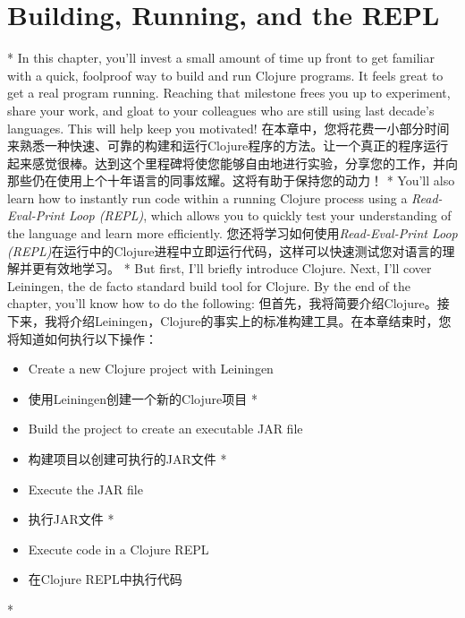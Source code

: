
\chapter{Building, Running, and the REPL}
\begin{paracol}{2}
\switchcolumn[0]*
In this chapter, you'll invest a small amount of time up front to get
familiar with a quick, foolproof way to build and run Clojure programs.
It feels great to get a real program running. Reaching that milestone
frees you up to experiment, share your work, and gloat to your
colleagues who are still using last decade's languages. This will help
keep you motivated!
\switchcolumn
在本章中，您将花费一小部分时间来熟悉一种快速、可靠的构建和运行Clojure程序的方法。让一个真正的程序运行起来感觉很棒。达到这个里程碑将使您能够自由地进行实验，分享您的工作，并向那些仍在使用上个十年语言的同事炫耀。这将有助于保持您的动力！
\switchcolumn[0]*
You'll also learn how to instantly run code within a running Clojure
process using a \emph{Read-Eval-Print Loop (REPL)}, which allows you to
quickly test your understanding of the language and learn more
efficiently.
\switchcolumn
您还将学习如何使用\emph{Read-Eval-Print Loop (REPL)}在运行中的Clojure进程中立即运行代码，这样可以快速测试您对语言的理解并更有效地学习。
\switchcolumn[0]*
But first, I'll briefly introduce Clojure. Next, I'll cover Leiningen,
the de facto standard build tool for Clojure. By the end of the chapter,
you'll know how to do the following:
\switchcolumn
但首先，我将简要介绍Clojure。接下来，我将介绍Leiningen，Clojure的事实上的标准构建工具。在本章结束时，您将知道如何执行以下操作：

\begin{itemize}
\switchcolumn[0]*
\item Create a new Clojure project with Leiningen
\switchcolumn
\item 使用Leiningen创建一个新的Clojure项目
\switchcolumn[0]*
\item Build the project to create an executable JAR file
\switchcolumn
\item 构建项目以创建可执行的JAR文件
\switchcolumn[0]*
\item Execute the JAR file
\switchcolumn
\item 执行JAR文件
\switchcolumn[0]*
\item Execute code in a Clojure REPL
\switchcolumn
\item 在Clojure REPL中执行代码
\end{itemize}
\switchcolumn[0]*


\end{paracol}
